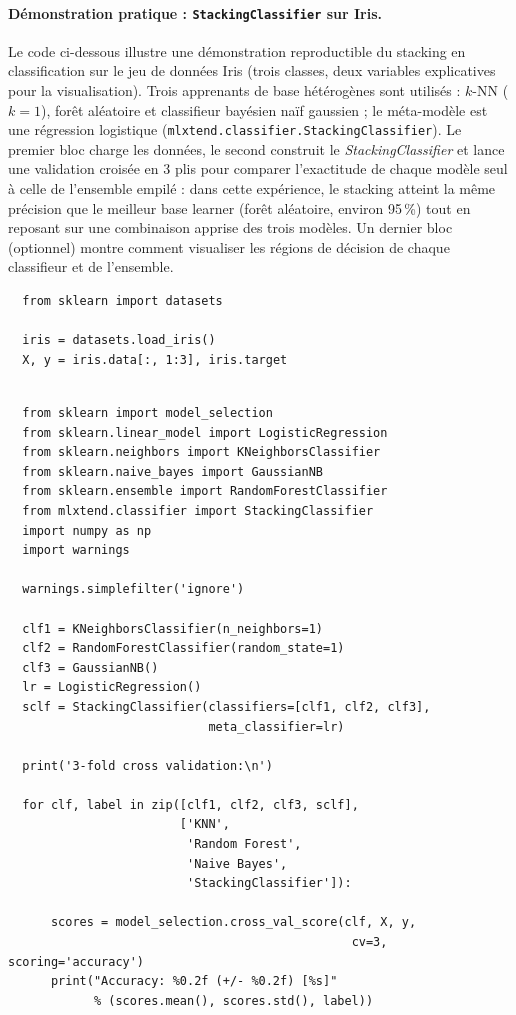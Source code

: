\paragraph{Démonstration pratique : \texttt{StackingClassifier} sur Iris.}
Le code ci-dessous illustre une démonstration reproductible du stacking en classification sur le
jeu de données Iris (trois classes, deux variables explicatives pour la visualisation). Trois
apprenants de base hétérogènes sont utilisés : $k$-NN ($k=1$), forêt aléatoire et classifieur
bayésien naïf gaussien ; le méta-modèle est une régression logistique (\texttt{mlxtend.classifier.StackingClassifier}). Le premier bloc charge les données, le second construit le \emph{StackingClassifier} et lance une validation croisée en 3 plis pour comparer l'exactitude de chaque modèle seul à celle de l'ensemble empilé : dans cette expérience, le stacking atteint la même précision que le meilleur base learner (forêt aléatoire, environ 95\,\%) tout en reposant sur une combinaison apprise des trois modèles. Un dernier bloc (optionnel) montre comment visualiser les régions de décision de chaque classifieur et de l'ensemble.

\begin{lstlisting}
  from sklearn import datasets
  
  iris = datasets.load_iris()
  X, y = iris.data[:, 1:3], iris.target\end{lstlisting}
  
  \begin{lstlisting}
  
  from sklearn import model_selection
  from sklearn.linear_model import LogisticRegression
  from sklearn.neighbors import KNeighborsClassifier
  from sklearn.naive_bayes import GaussianNB 
  from sklearn.ensemble import RandomForestClassifier
  from mlxtend.classifier import StackingClassifier
  import numpy as np
  import warnings
  
  warnings.simplefilter('ignore')
  
  clf1 = KNeighborsClassifier(n_neighbors=1)
  clf2 = RandomForestClassifier(random_state=1)
  clf3 = GaussianNB()
  lr = LogisticRegression()
  sclf = StackingClassifier(classifiers=[clf1, clf2, clf3], 
                            meta_classifier=lr)
  
  print('3-fold cross validation:\n')
  
  for clf, label in zip([clf1, clf2, clf3, sclf], 
                        ['KNN', 
                         'Random Forest', 
                         'Naive Bayes',
                         'StackingClassifier']):
  
      scores = model_selection.cross_val_score(clf, X, y, 
                                                cv=3, scoring='accuracy')
      print("Accuracy: %0.2f (+/- %0.2f) [%s]" 
            % (scores.mean(), scores.std(), label))
  
  \end{lstlisting}
  
